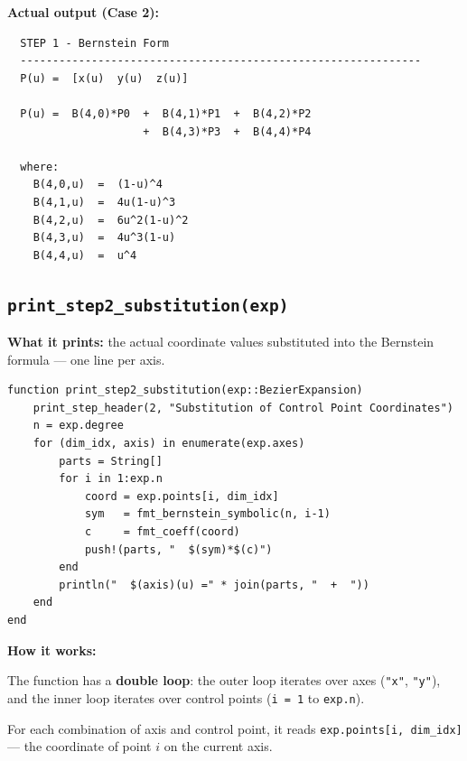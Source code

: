 \documentclass[12pt, a4paper]{article}
\newcommand{\cd}[1]{\texttt{#1}}
\begin{document}
\textbf{Actual output (Case 2):}
\begin{verbatim}
  STEP 1 - Bernstein Form
  --------------------------------------------------------------
  P(u) =  [x(u)  y(u)  z(u)]

  P(u) =  B(4,0)*P0  +  B(4,1)*P1  +  B(4,2)*P2
                     +  B(4,3)*P3  +  B(4,4)*P4

  where:
    B(4,0,u)  =  (1-u)^4
    B(4,1,u)  =  4u(1-u)^3
    B(4,2,u)  =  6u^2(1-u)^2
    B(4,3,u)  =  4u^3(1-u)
    B(4,4,u)  =  u^4
\end{verbatim}

\subsection{\texttt{print\_step2\_substitution(exp)}}

\textbf{What it prints:} the actual coordinate values substituted
into the Bernstein formula --- one line per axis.

\begin{verbatim}
function print_step2_substitution(exp::BezierExpansion)
    print_step_header(2, "Substitution of Control Point Coordinates")
    n = exp.degree
    for (dim_idx, axis) in enumerate(exp.axes)
        parts = String[]
        for i in 1:exp.n
            coord = exp.points[i, dim_idx]
            sym   = fmt_bernstein_symbolic(n, i-1)
            c     = fmt_coeff(coord)
            push!(parts, "  $(sym)*$(c)")
        end
        println("  $(axis)(u) =" * join(parts, "  +  "))
    end
end
\end{verbatim}

\textbf{How it works:}

The function has a \textbf{double loop}: the outer loop iterates
over axes (\cd{"x"}, \cd{"y"}), and the inner loop iterates over
control points (\cd{i = 1} to \cd{exp.n}).

For each combination of axis and control point, it reads
\cd{exp.points[i, dim\_idx]} --- the coordinate of point $i$
on the current axis.
\end{document}
